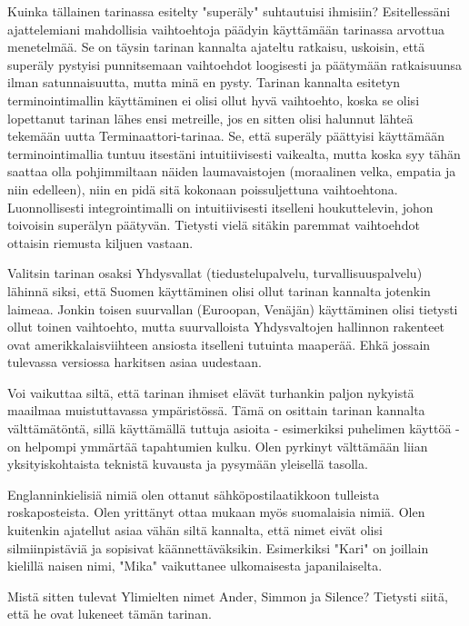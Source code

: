 \psep Kuinka tällainen tarinassa esitelty "superäly" suhtautuisi ihmisiin? Esitellessäni ajattelemiani mahdollisia vaihtoehtoja päädyin käyttämään tarinassa arvottua menetelmää. Se on täysin tarinan kannalta ajateltu ratkaisu, uskoisin, että superäly pystyisi punnitsemaan vaihtoehdot loogisesti ja päätymään ratkaisuunsa ilman satunnaisuutta, mutta minä en pysty. Tarinan kannalta esitetyn terminointimallin käyttäminen ei olisi ollut hyvä vaihtoehto, koska se olisi lopettanut tarinan lähes ensi metreille, jos en sitten olisi halunnut lähteä tekemään uutta Terminaattori-tarinaa. Se, että superäly päättyisi käyttämään terminointimallia tuntuu itsestäni intuitiivisesti vaikealta, mutta koska syy tähän saattaa olla pohjimmiltaan näiden laumavaistojen (moraalinen velka, empatia ja niin edelleen), niin en pidä sitä kokonaan poissuljettuna vaihtoehtona. Luonnollisesti integrointimalli on intuitiivisesti itselleni houkuttelevin, johon toivoisin superälyn päätyvän. Tietysti vielä sitäkin paremmat vaihtoehdot ottaisin riemusta kiljuen vastaan.




\psep Valitsin tarinan osaksi Yhdysvallat (tiedustelupalvelu, turvallisuuspalvelu) lähinnä siksi, että Suomen käyttäminen olisi ollut tarinan kannalta jotenkin laimeaa. Jonkin toisen suurvallan (Euroopan, Venäjän) käyttäminen olisi tietysti ollut toinen vaihtoehto, mutta suurvalloista Yhdysvaltojen hallinnon rakenteet ovat amerikkalaisviihteen ansiosta itselleni tutuinta maaperää. Ehkä jossain tulevassa versiossa harkitsen asiaa uudestaan.


Voi vaikuttaa siltä, että tarinan ihmiset elävät turhankin paljon nykyistä maailmaa muistuttavassa ympäristössä. Tämä on osittain tarinan kannalta välttämätöntä, sillä käyttämällä tuttuja asioita - esimerkiksi puhelimen käyttöä - on helpompi ymmärtää tapahtumien kulku. Olen pyrkinyt välttämään liian yksityiskohtaista teknistä kuvausta ja pysymään yleisellä tasolla.




\psep Englanninkielisiä nimiä olen ottanut sähköpostilaatikkoon tulleista roskaposteista. Olen yrittänyt ottaa mukaan myös suomalaisia nimiä. Olen kuitenkin ajatellut asiaa vähän siltä kannalta, että nimet eivät olisi silmiinpistäviä ja sopisivat käännettäväksikin. Esimerkiksi "Kari" on joillain kielillä naisen nimi, "Mika" vaikuttanee ulkomaisesta japanilaiselta.


Mistä sitten tulevat Ylimielten nimet Ander, Simmon ja Silence? Tietysti siitä, että he ovat lukeneet tämän tarinan.










